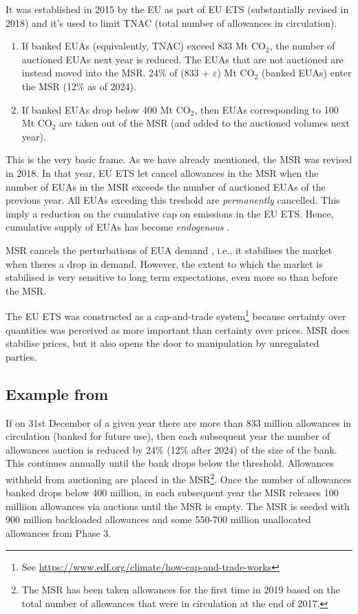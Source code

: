 It was established in 2015 by the EU as part of EU ETS (substantially revised in 2018) and it's used to limit TNAC (total number of allowances in circulation).
\begin{enumerate}[wide, itemsep=0cm, topsep=0cm, label=$\bullet$]
	\item If banked EUAs (equivalently, TNAC) exceed 833 Mt CO$_2$, the number of auctioned EUAs next year is reduced.  The EUAs that are not auctioned are instead moved into the MSR. 24\% of (833 + $\varepsilon$) Mt CO$_2$ (banked EUAs) enter the MSR (12\% as of 2024). 
	\item If banked EUAs drop below 400 Mt CO$_2$, then EUAs corresponding to 100 Mt CO$_2$ are taken out of the MSR (and added to the auctioned volumes next year).
\end{enumerate} 
This is the very basic frame. As we have already mentioned, the MSR was revised in 2018. In that year, EU ETS let cancel allowances in the MSR when the number of EUAs in the MSR exceeds the number of auctioned EUAs of the previous year. All EUAs exceding this treshold are \emph{permanently} cancelled. This imply a reduction on the cumulative cap on emissions in the EU ETS. Hence, cumulative supply of EUAs has become \emph{endogenous} \cite{perino2018new,gerlagh2020covid}.

MSR cancels the perturbations of EUA demand \cite{gerlagh2020covid}, i.e., it stabilises the market when theres a drop in demand. However, the extent to which the market is stabilised is very sensitive to long term expectations, even more so than before the MSR. 

The EU ETS was constructed as a cap-and-trade system\footnote{See \url{https://www.edf.org/climate/how-cap-and-trade-works}} because certainty over quantities was perceived as more important than certainty over prices. MSR does stabilise prices, but it also opens the door to manipulation by unregulated parties.

\subsection{Example from \cite{perino2018new}}

If on 31st December of a given year there are more than 833 million allowances in circulation (banked for future use), then each subsequent year the number of allowances auction is reduced by 24\% (12\% after 2024) of the size of the bank. This continues annually until the bank drops below the threshold. Allowances withheld from auctioning are placed in the MSR\footnote{The MSR has been taken allowances for the first time in 2019 based on the total number of allowances that were in circulation at the end of 2017.}. Once the number of allowances banked drops below 400 million, in each subsequent year the MSR releases 100 milliion allowances via auctions until the MSR is empty. The MSR is seeded with 900 million backloaded allowances and some 550-700 million unallocated allowances from Phase 3. 

